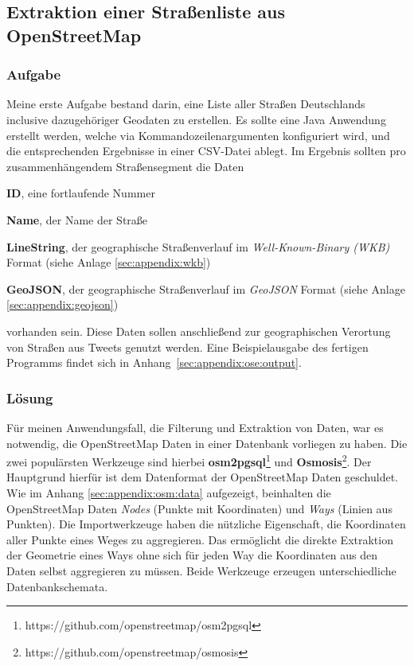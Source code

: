 \subsection{Extraktion einer Straßenliste aus OpenStreetMap}

\subsubsection{Aufgabe}
Meine erste Aufgabe bestand darin, eine Liste aller Straßen Deutschlands inclusive dazugehöriger Geodaten zu erstellen.
Es sollte eine Java Anwendung erstellt werden, welche via Kommandozeilenargumenten konfiguriert wird, und die entsprechenden Ergebnisse in einer CSV-Datei ablegt.
Im Ergebnis sollten pro zusammenhängendem Straßensegment die Daten
\begin{compactitem}
  \item \textbf{ID}, eine fortlaufende Nummer
  \item \textbf{Name}, der Name der Straße
  \item \textbf{LineString}, der geographische Straßenverlauf im \textit{Well-Known-Binary (WKB)} Format (siehe Anlage \ref{sec:appendix:wkb})
  \item \textbf{GeoJSON}, der geographische Straßenverlauf im \textit{GeoJSON} Format (siehe Anlage \ref{sec:appendix:geojson})
\end{compactitem}
vorhanden sein.
Diese Daten sollen anschließend zur geographischen Verortung von Straßen aus Tweets genutzt werden.
Eine Beispielausgabe des fertigen Programms findet sich in Anhang~\ref{sec:appendix:ose:output}.

\subsubsection{Lösung}

Für meinen Anwendungsfall, die Filterung und Extraktion von Daten, war es notwendig, die OpenStreetMap Daten in einer Datenbank vorliegen zu haben.
Die zwei populärsten Werkzeuge sind hierbei \textbf{osm2pgsql}\footnote{https://github.com/openstreetmap/osm2pgsql}\label{osm2pgsql} und \textbf{Osmosis}\footnote{https://github.com/openstreetmap/osmosis}.
Der Hauptgrund hierfür ist dem Datenformat der OpenStreetMap Daten geschuldet. Wie im Anhang \ref{sec:appendix:osm:data} aufgezeigt, beinhalten die OpenStreetMap Daten \textit{Nodes} (Punkte mit Koordinaten) und \textit{Ways} (Linien aus Punkten). Die Importwerkzeuge haben die nützliche Eigenschaft, die Koordinaten aller Punkte eines Weges zu aggregieren.
Das ermöglicht die direkte Extraktion der Geometrie eines Ways ohne sich für jeden Way die Koordinaten aus den Daten selbst aggregieren zu müssen.
Beide Werkzeuge erzeugen unterschiedliche Datenbankschemata.

